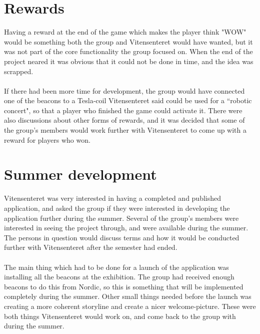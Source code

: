 \section{Rewards}
Having a reward at the end of the game which makes the player think "WOW" would be something both the group and Vitensenteret would have wanted, but it was not part of the core functionality the group focused on. When the end of the project neared it was obvious that it could not be done in time, and the idea was scrapped.
\\\\
If there had been more time for development, the group would have connected one of the beacons to a Tesla-coil Vitensenteret said could be used for a ``robotic concert", so that a player who finished the game could activate it. There were also discussions about other forms of rewards, and it was decided that some of the group's members would work further with Vitensenteret to come up with a reward for players who won.

\section{Summer development}
Vitensenteret was very interested in having a completed and published application, and asked the group if they were interested in developing the application further during the summer. Several of the group's members were interested in seeing the project through, and were available during the summer. The persons in question would discuss terms and how it would be conducted further with Vitensenteret after the semester had ended.
\\\\
The main thing which had to be done for a launch of the application was installing all the beacons at the exhibition. The group had received enough beacons to do this from Nordic, so this is something that will be implemented completely during the summer. Other small things needed before the launch was creating a more coherent storyline and create a nicer welcome-picture. These were both things Vitensenteret would work on, and come back to the group with during the summer.